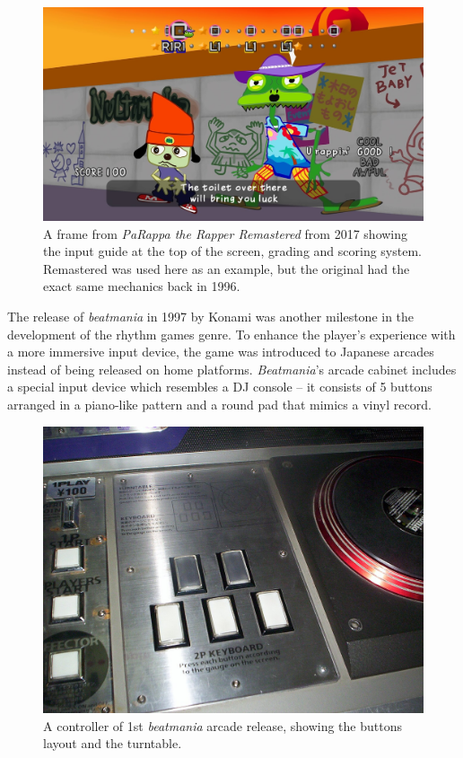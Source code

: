 \begin{figure}[h]
    \centering\includegraphics[scale=0.15]{obrazki/parappatherapper.jpg}
    \caption{A frame from \textit{PaRappa the Rapper Remastered} from 2017 showing the input guide at the top of the screen, grading and scoring system. Remastered was used here as an example, but the original had the exact same mechanics back in 1996. \cite{parappatherapper}}
    \label{fig:parappa_the_rapper}
\end{figure}

The release of \textit{beatmania} in 1997 by Konami was another milestone in the development of the rhythm games genre. To enhance the player's experience with a more immersive input device, the game was introduced to Japanese arcades instead of being released on home platforms. \textit{Beatmania}'s arcade cabinet includes a special input device which resembles a DJ console -- it consists of 5 buttons arranged in a piano-like pattern and a round pad that mimics a vinyl record.

\begin{figure}[h]
    \centering\includegraphics[scale=0.15]{obrazki/beatmaniacontrols.jpg}
    \caption{A controller of 1st \textit{beatmania} arcade release, showing the buttons layout and the turntable. \cite{beatmaniacontrols}}
    \label{fig:beatmania_controls}
\end{figure}

